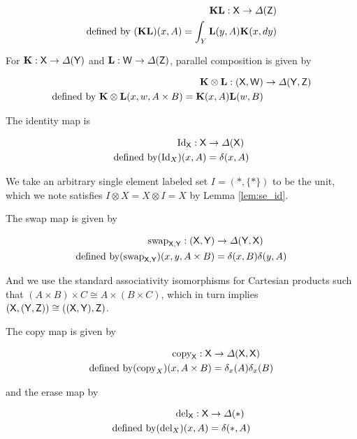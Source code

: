 \begin{align}
    \mathbf{K}\mathbf{L}:\mathsf{X}\to \Delta(\mathsf{Z})\\
    \text{defined by } (\mathbf{KL})(x,A) = \int_Y \mathbf{L}(y,A)\mathbf{K}(x,dy)
\end{align}

For $\mathbf{K}:\mathsf{X}\to \Delta(\mathsf{Y})$ and $\mathbf{L}:\mathsf{W}\to\Delta(\mathsf{Z})$, parallel composition is given by

\begin{align}
    \mathbf{K}\otimes\mathbf{L}: (\mathsf{X},\mathsf{W}) &\to \Delta(\mathsf{Y},\mathsf{Z})\\
    \text{defined by } \mathbf{K}\otimes\mathbf{L}(x,w,A\times B) = \mathbf{K}(x,A)\mathbf{L}(w,B)
\end{align}

The identity map is

\begin{align}
    \text{Id}_{\mathsf{X}}: \mathsf{X}&\to\Delta(\mathsf{X})\\
    \text{defined by} (\text{Id}_X) (x,A) &= \delta(x,A)
\end{align}

We take an arbitrary single element labeled set $I=(*,\{*\})$ to be the unit, which we note satisfies $I\otimes X=X\otimes I=X$ by Lemma \ref{lem:se_id}.

The swap map is given by

\begin{align}
    \text{swap}_{\mathsf{X},\mathsf{Y}}: (\mathsf{X},\mathsf{Y})&\to \Delta(\mathsf{Y},\mathsf{X})\\
    \text{defined by} (\text{swap}_{\mathsf{X},\mathsf{Y}})(x,y,A\times B) &= \delta(x,B)\delta(y,A)
\end{align}

And we use the standard associativity isomorphisms for Cartesian products such that $(A\times B)\times C\cong A\times (B\times C)$, which in turn implies $(\mathsf{X},(\mathsf{Y},\mathsf{Z}))\cong ((\mathsf{X},\mathsf{Y}),\mathsf{Z})$.

The copy map is given by

\begin{align}
    \text{copy}_{\mathsf{X}}: \mathsf{X}&\to \Delta(\mathsf{X},\mathsf{X})\\
    \text{defined by} (\text{copy}_X)(x,A\times B) &= \delta_x(A)\delta_x(B)
\end{align}

and the erase map by

\begin{align}
    \text{del}_{\mathsf{X}}: \mathsf{X}&\to \Delta(*)\\
    \text{defined by} (\text{del}_X)(x,A) &= \delta(*,A)\\
\end{align}

